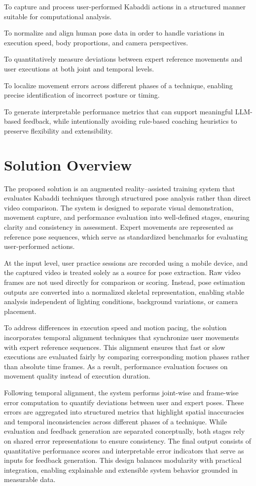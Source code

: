 \documentclass[12pt, a4paper]{report}
\begin{document}
To capture and process user-performed Kabaddi actions in a structured manner suitable for computational analysis.

To normalize and align human pose data in order to handle variations in execution speed, body proportions, and camera perspectives.

To quantitatively measure deviations between expert reference movements and user executions at both joint and temporal levels.

To localize movement errors across different phases of a technique, enabling precise identification of incorrect posture or timing.

To generate interpretable performance metrics that can support meaningful LLM-based feedback, while intentionally avoiding rule-based coaching heuristics to preserve flexibility and extensibility.


\section{Solution Overview}
The proposed solution is an augmented reality–assisted training system that evaluates Kabaddi techniques through structured pose analysis rather than direct video comparison. The system is designed to separate visual demonstration, movement capture, and performance evaluation into well-defined stages, ensuring clarity and consistency in assessment. Expert movements are represented as reference pose sequences, which serve as standardized benchmarks for evaluating user-performed actions.

At the input level, user practice sessions are recorded using a mobile device, and the captured video is treated solely as a source for pose extraction. Raw video frames are not used directly for comparison or scoring. Instead, pose estimation outputs are converted into a normalized skeletal representation, enabling stable analysis independent of lighting conditions, background variations, or camera placement.

To address differences in execution speed and motion pacing, the solution incorporates temporal alignment techniques that synchronize user movements with expert reference sequences. This alignment ensures that fast or slow executions are evaluated fairly by comparing corresponding motion phases rather than absolute time frames. As a result, performance evaluation focuses on movement quality instead of execution duration.

Following temporal alignment, the system performs joint-wise and frame-wise error computation to quantify deviations between user and expert poses. These errors are aggregated into structured metrics that highlight spatial inaccuracies and temporal inconsistencies across different phases of a technique. While evaluation and feedback generation are separated conceptually, both stages rely on shared error representations to ensure consistency. The final output consists of quantitative performance scores and interpretable error indicators that serve as inputs for feedback generation. This design balances modularity with practical integration, enabling explainable and extensible system behavior grounded in measurable data.
\end{document}
